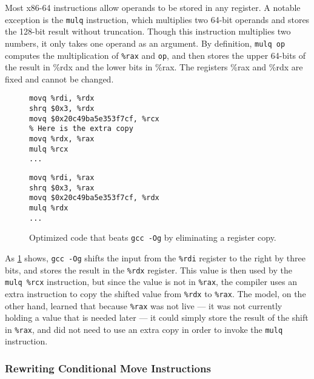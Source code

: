 \documentclass{article}
\begin{document}
Most x86-64 instructions allow operands to be stored in any register.  A notable exception is the  \texttt{mulq} instruction, which multiplies two 64-bit operands and stores the 128-bit result without truncation.
%
Though this instruction multiplies two numbers, it only takes one operand as an argument.  By definition, \texttt{mulq op} computes the multiplication of \texttt{\%rax} and \texttt{op}, and then stores the upper 64-bits of the result in \%rdx and the lower bits in \%rax.  The registers \%rax and \%rdx are fixed and cannot be changed.
%
\begin{figure}
    \begin{lstlisting}
movq %rdi, %rdx
shrq $0x3, %rdx
movq $0x20c49ba5e353f7cf, %rcx
% Here is the extra copy
movq %rdx, %rax
mulq %rcx
...
    \end{lstlisting}


    \begin{lstlisting}
movq %rdi, %rax
shrq $0x3, %rax
movq $0x20c49ba5e353f7cf, %rdx
mulq %rdx
...
    \end{lstlisting}
    \centering
    \caption{Optimized code that beats \texttt{gcc -Og} by eliminating a register copy.}
    \label{fig:elim_copy}

\end{figure}

As \cref{fig:elim_copy} shows,
\texttt{gcc -Og} shifts the input from the \texttt{\%rdi} register to the right by three bits, and stores the result in the \texttt{\%rdx} register.  This value is then used by the \texttt{mulq \%rcx} instruction, but since the value is not in \texttt{\%rax}, the compiler uses an extra instruction to copy the shifted value from \texttt{\%rdx} to \texttt{\%rax}.
%
The model, on the other hand, learned that because \texttt{\%rax} was not live --- it was not currently holding a value that is needed later --- it could simply store the result of the shift in \texttt{\%rax}, and did not need to use an extra copy in order to invoke the \texttt{mulq} instruction.

\subsubsection{Rewriting Conditional Move Instructions}
\end{document}
